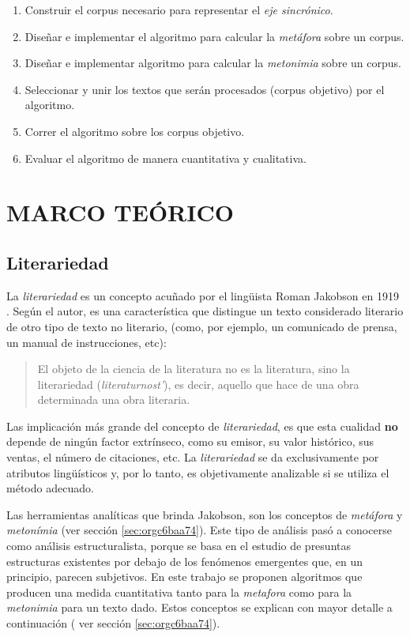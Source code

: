 \documentclass[12pt,letterpaper,twoside]{article}
\begin{document}
\begin{enumerate}
\item Construir el corpus necesario para representar el \emph{eje sincrónico}.
\item Diseñar e implementar el algoritmo para calcular la \emph{metáfora} sobre un corpus.
\item Diseñar e implementar algoritmo para calcular la \emph{metonimia} sobre un corpus.
\item Seleccionar y unir los textos que serán procesados (corpus objetivo) por el algoritmo.
\item Correr el algoritmo sobre los corpus objetivo.
\item Evaluar el algoritmo de manera cuantitativa y cualitativa.
\end{enumerate}

\section{MARCO TEÓRICO}
\label{sec:org33b621f}

\subsection{Literariedad}
\label{sec:org829ce9c}



La \emph{literariedad} es un concepto acuñado por el lingüista Roman
Jakobson en 1919 \cite{jakobson1981linguistica}. Según el autor, es
una característica que distingue un texto considerado literario de
otro tipo de texto no literario, (como, por ejemplo, un comunicado
de prensa, un manual de instrucciones, etc):


\begin{quote}
El objeto de la ciencia de la literatura no es la literatura, sino
la literariedad (\emph{literaturnost'}), es decir, aquello que hace
de una obra determinada una obra
literaria. \cite[pg. 37]{eijembaum2010teoria}
\end{quote}

Las implicación más grande del concepto de \emph{literariedad}, es que
esta cualidad \textbf{no} depende de ningún factor extrínseco, como su
emisor, su valor histórico, sus ventas, el número de citaciones,
etc. La \emph{literariedad} se da exclusivamente por atributos
lingüísticos y, por lo tanto, es objetivamente analizable si se
utiliza el método adecuado.

Las herramientas analíticas que brinda Jakobson, son los conceptos
de \emph{metáfora} y \emph{metonímia} (ver sección \ref{sec:orgc6baa74}).  Este tipo
de análisis pasó a conocerse como análisis estructuralista, porque
se basa en el estudio de presuntas estructuras existentes por debajo
de los fenómenos emergentes que, en un principio, parecen
subjetivos. En este trabajo se proponen algoritmos que producen una
medida cuantitativa tanto para la \emph{metafora} como para la \emph{metonimia}
para un texto dado. Estos conceptos se explican con mayor
detalle a continuación ( ver sección \ref{sec:orgc6baa74}).
\end{document}
